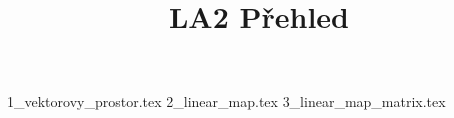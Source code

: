 \documentclass[a4paper]{article}
\begin{document}
\title{LA2 Přehled}

\maketitle
\pagebreak

{1_vektorovy_prostor.tex}
{2_linear_map.tex}
{3_linear_map_matrix.tex}
\end{document}
